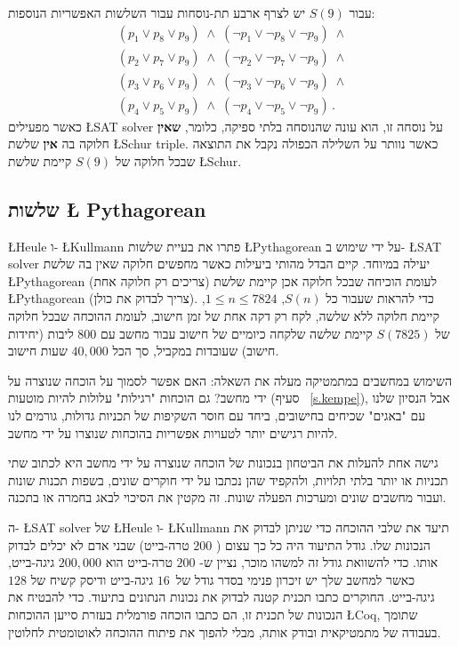 עבור 
$S(9)$
יש לצרף ארבע תת-נוסחות עבור השלשות האפשריות הנוספות:
\[
\begin{array}{l}
(p_1 \vee p_8 \vee p_9) \;\wedge\; (\neg p_1 \vee \neg p_8 \vee \neg p_9) \;\wedge \\
(p_2 \vee p_7 \vee p_9) \;\wedge\; (\neg p_2 \vee \neg p_7 \vee \neg p_9) \;\wedge \\
(p_3 \vee p_6 \vee p_9) \;\wedge\; (\neg p_3 \vee \neg p_6 \vee \neg p_9) \;\wedge \\
(p_4 \vee p_5 \vee p_9) \;\wedge\; (\neg p_4 \vee \neg p_5 \vee \neg p_9)\,.
\end{array}
\]
כאשר מפעילים 
\L{SAT solver}
על נוסחה זו, הוא עונה שהנוסחה בלתי ספיקה, כלומר, 
\textbf{שאין}
חלוקה בה 
\textbf{אין }
שלשת
\L{Schur triple}. 
כאשר נוותר על השלילה הכפולה נקבל את התוצאה שבכל חלוקה של
$S(9)$
קיימת שלשת
\L{Schur}.

\subsection{שלשות \L{ Pythagorean}}

\L{Heule}
ו-%
\L{Kullmann}
פתרו את בעיית שלשות
\L{Pythagorean}
על ידי שימוש ב-%
\L{SAT solver}
יעילה במיוחד. קיים הבדל מהותי ביעילות כאשר מחפשים חלוקה שאין בה שלשת
\L{Pythagorean}
(צריכים רק חלוקה אחת) לעומת הוכיחה שבכל חלוקה אכן קיימת שלשת
\L{Pythagorean}
(צריך לבדוק את כולן). כדי להראות שעבור כל
$S(n)$, $1\leq n\leq 7824$, 
קיימת חלוקה ללא שלשה, לקח רק דקה אחת של זמן חישוב, לעומת ההוכחה שבכל חלוקה של
$S(7825)$
קיימת שלשה שלקחה כיומיים של חישוב עבור מחשב עם
$800$
ליבות (יחידות חישוב) שעובדות במקביל, סך הכל 
$40,000$
שעות חישוב.

השימוש במחשבים במתמטיקה מעלה את השאלה: האם אפשר לסמוך על הוכחה שנוצרה על ידי מחשב? גם הוכחות "רגילות" עלולות להיות מוטעות (סעיף%
~\ref{s.kempe}),
אבל הנסיון שלנו עם "באגים" שכיחים בחישובים, ביחד עם חוסר השקיפות של תכניות גדולות, גורמים לנו להיות רגישים יותר לטעויות אפשריות בהוכחות שנוצרו על ידי מחשב.

גישה אחת להעלות את הביטחון בנכונות של הוכחה שנוצרה על ידי מחשב היא לכתוב שתי תכניות או יותר בלתי תלויות, ולהקפיד שהן נכתבו על ידי חוקרים שונים, בשפות תכנות שונות ועבור מחשבים שונים ומערכות הפעלה שונות. זה מקטין את הסיכוי לבאג בחמרה או בתכנה.

ה-%
\L{SAT solver}
של
\L{Heule}
ו-%
\L{Kullmann}
תיעד את שלבי ההוכחה כדי שניתן לבדוק את הנכונות שלו. גודל התיעוד היה כל כך עצום (%
$200$
טרה-בייט) שבני אדם לא יכלים לבדוק אותו. כדי להשוואת גודל זה למשהו מוכר, נציין ש-%
$200$
טרה-בייט הוא 
$200,\!000$
גיגה-בייט, כאשר למחשב שלך יש זיכרון פנימי בסדר גודל של\
$16$
גיגה-בייט ודיסק קשיח של
$128$
גיגה-בייט. החוקרים כתבו תכנית קטנה לבדוק את נכונות הנתונים בתיעוד. כדי להבטיח את הנכונות של תכנית זו, הם כתבו הוכחה פורמלית בעזרת סייען ההוכחות
\L{Coq},
שתומך בעבודה של מתמטיקאית ובודק אותה, מבלי להפוך את פיתוח ההוכחה לאוטומטית לחלוטין.

